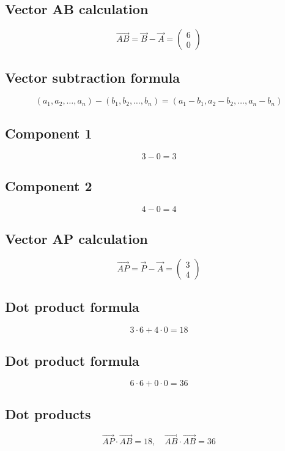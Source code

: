 \documentclass{article}
\begin{document}
\subsection*{ \vspace{1em} Vector AB calculation}
\[
\vec{AB} = \vec{B} - \vec{A} = \begin{pmatrix}6 \\ 0\end{pmatrix}
\]
\subsection*{ \vspace{1em} Vector subtraction formula}
\[
(a_1, a_2, \dots, a_n) - (b_1, b_2, \dots, b_n) = (a_1 - b_1, a_2 - b_2, \dots, a_n - b_n)
\]
\subsection*{ \vspace{1em} Component 1}
\[
3 - 0 = 3
\]
\subsection*{ \vspace{1em} Component 2}
\[
4 - 0 = 4
\]
\subsection*{ \vspace{1em} Vector AP calculation}
\[
\vec{AP} = \vec{P} - \vec{A} = \begin{pmatrix}3 \\ 4\end{pmatrix}
\]
\subsection*{ \vspace{1em} Dot product formula}
\[
3 \cdot 6 + 4 \cdot 0 = 18
\]
\subsection*{ \vspace{1em} Dot product formula}
\[
6 \cdot 6 + 0 \cdot 0 = 36
\]
\subsection*{ \vspace{1em} Dot products}
\[
\vec{AP} \cdot \vec{AB} = 18, \quad \vec{AB} \cdot \vec{AB} = 36
\]
\end{document}
